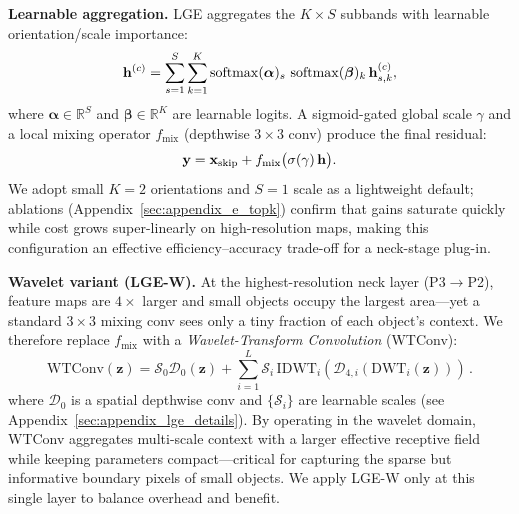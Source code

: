 \documentclass{article}
\theoremstyle{plain}
\theoremstyle{definition}
\theoremstyle{remark}
\begin{document}
\noindent\textbf{Learnable aggregation.}
LGE aggregates the $K{\times}S$ subbands with learnable orientation/scale importance:
\vspace{-0.2cm}
\begin{equation}
\label{eq:lgn_agg}
\mathbf{h}^{(c)} = \sum_{s=1}^{S}\sum_{k=1}^{K} \operatorname{softmax}(\boldsymbol{\alpha})_{s}\,\operatorname{softmax}(\boldsymbol{\beta})_{k}\,\mathbf{h}^{(c)}_{s,k},
\vspace{-0.2cm}
\end{equation}
where $\boldsymbol{\alpha}\in\mathbb{R}^{S}$ and $\boldsymbol{\beta}\in\mathbb{R}^{K}$ are learnable logits. A sigmoid-gated global scale $\gamma$ and a local mixing operator $f_{\mathrm{mix}}$ (depthwise $3{\times}3$ conv) produce the final residual:
\vspace{-0.2cm}
\begin{equation}
\label{eq:lgn_out}
\mathbf{y} = \mathbf{x}_{\mathrm{skip}} + f_{\mathrm{mix}}\bigl(\sigma(\gamma)\,\mathbf{h}\bigr).
\vspace{-0.2cm}
\end{equation}
We adopt small $K{=}2$ orientations and $S{=}1$ scale as a lightweight default; ablations (Appendix~\ref{sec:appendix_e_topk}) confirm that gains saturate quickly while cost grows super-linearly on high-resolution maps, making this configuration an effective efficiency--accuracy trade-off for a neck-stage plug-in.

\noindent\textbf{Wavelet variant (LGE-W).}
At the highest-resolution neck layer (P3$\to$P2), feature maps are $4{\times}$ larger and small objects occupy the largest area---yet a standard $3{\times}3$ mixing conv sees only a tiny fraction of each object's context. We therefore replace $f_{\mathrm{mix}}$ with a \emph{Wavelet-Transform Convolution} (WTConv):
\vspace{-0.2cm}
\begin{equation}
\label{eq:wtconv_main}
\mathrm{WTConv}(\mathbf{z})=\mathcal{S}_0\mathcal{D}_0(\mathbf{z})+\textstyle\sum_{i=1}^{L}\mathcal{S}_i\,\mathrm{IDWT}_i(\mathcal{D}_{4,i}(\mathrm{DWT}_i(\mathbf{z})))\,.
\end{equation}
where $\mathcal{D}_0$ is a spatial depthwise conv and $\{\mathcal{S}_i\}$ are learnable scales (see Appendix~\ref{sec:appendix_lge_details}). By operating in the wavelet domain, WTConv aggregates multi-scale context with a larger effective receptive field while keeping parameters compact---critical for capturing the sparse but informative boundary pixels of small objects. We apply LGE-W only at this single layer to balance overhead and benefit.
 
\end{document}
